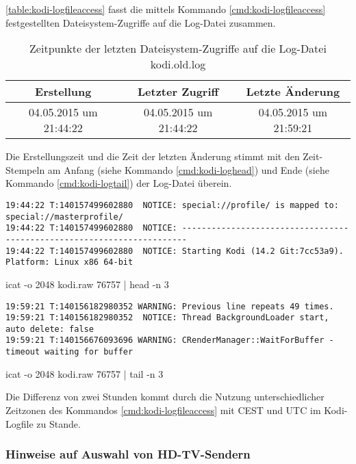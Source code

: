\autoref{table:kodi-logfileaccess} fasst die mittels Kommando \autoref{cmd:kodi-logfileaccess} festgestellten Dateisystem-Zugriffe auf die Log-Datei zusammen.

\begin{table}[H]
\begin{tabular}{ccc}
\hline 
Erstellung & Letzter Zugriff & Letzte Änderung \\ 
\hline 
04.05.2015 um 21:44:22 & 04.05.2015 um 21:44:22 & 04.05.2015 um 21:59:21 \\ 
\hline 
\end{tabular}
\caption{Zeitpunkte der letzten Dateisystem-Zugriffe auf die Log-Datei kodi.old.log}
\label{table:kodi-logfileaccess}
\end{table}

Die Erstellungszeit und die Zeit der letzten Änderung stimmt mit den Zeit-Stempeln am Anfang (siehe Kommando \autoref{cmd:kodi-loghead}) und Ende (siehe Kommando \autoref{cmd:kodi-logtail}) der Log-Datei überein.

\begin{cmd}[H]
\begin{Verbatim}[fontsize=\tiny]
19:44:22 T:140157499602880  NOTICE: special://profile/ is mapped to: special://masterprofile/
19:44:22 T:140157499602880  NOTICE: -----------------------------------------------------------------------
19:44:22 T:140157499602880  NOTICE: Starting Kodi (14.2 Git:7cc53a9). Platform: Linux x86 64-bit
\end{Verbatim}
\caption{icat -o 2048 kodi.raw 76757 | head -n 3}
\label{cmd:kodi-loghead}
\end{cmd}

\begin{cmd}[H]
\begin{Verbatim}[fontsize=\tiny]
19:59:21 T:140156182980352 WARNING: Previous line repeats 49 times.
19:59:21 T:140156182980352  NOTICE: Thread BackgroundLoader start, auto delete: false
19:59:21 T:140156676093696 WARNING: CRenderManager::WaitForBuffer - timeout waiting for buffer
\end{Verbatim}
\caption{icat -o 2048 kodi.raw 76757 | tail -n 3}
\label{cmd:kodi-logtail}
\end{cmd}

Die Differenz von zwei Stunden kommt durch die Nutzung unterschiedlicher Zeitzonen des Kommandos \autoref{cmd:kodi-logfileaccess} mit CEST und UTC im Kodi-Logfile zu Stande.

\subsubsection{Hinweise auf Auswahl von HD-TV-Sendern}

